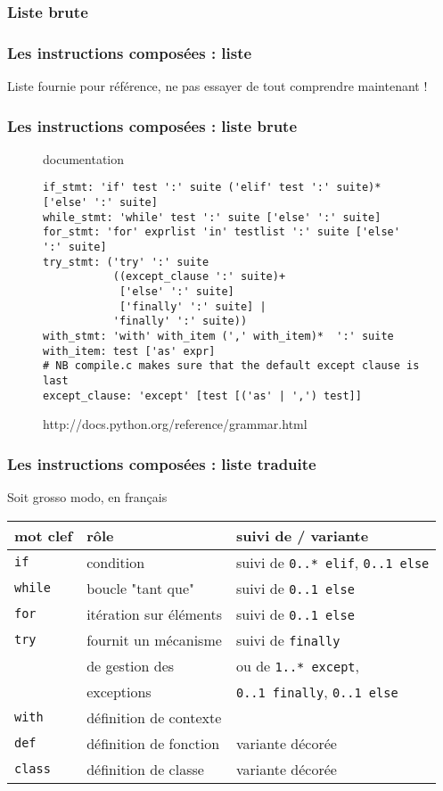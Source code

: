\subsubsection{Liste brute}
\begin{frame}[fragile]
  \frametitle{Les instructions composées : liste}
Liste fournie pour référence, ne pas essayer de tout comprendre maintenant !
\end{frame}

\begin{frame}[fragile]
  \frametitle{Les instructions composées : liste brute}
\begin{figure}
  \begin{beamercolorbox}{documentation}
\scriptsize\begin{verbatim}
if_stmt: 'if' test ':' suite ('elif' test ':' suite)* ['else' ':' suite]
while_stmt: 'while' test ':' suite ['else' ':' suite]
for_stmt: 'for' exprlist 'in' testlist ':' suite ['else' ':' suite]
try_stmt: ('try' ':' suite
           ((except_clause ':' suite)+
            ['else' ':' suite]
            ['finally' ':' suite] |
           'finally' ':' suite))
with_stmt: 'with' with_item (',' with_item)*  ':' suite
with_item: test ['as' expr]
# NB compile.c makes sure that the default except clause is last
except_clause: 'except' [test [('as' | ',') test]]
\end{verbatim}
  \end{beamercolorbox}
\def\figurename{extrait de la grammaire de Python}
\caption{http://docs.python.org/reference/grammar.html}
\end{figure}
\end{frame}

\begin{frame}[fragile]
  \frametitle{Les instructions composées : liste traduite}
Soit grosso modo, en français
\small\begin{tabular}{|l|l|l|}
\hline
mot clef & rôle & suivi de / variante \\
\hline \hline
\texttt{if} & condition & suivi de \texttt{0..* elif}, \texttt{0..1 else}\\ \hline
\texttt{while} & boucle "tant que" & suivi de \texttt{0..1 else}\\ \hline
\texttt{for} & itération sur éléments & suivi de \texttt{0..1 else}\\ \hline
\texttt{try} & fournit un mécanisme & suivi de \texttt{finally}\\
 & de gestion des &  ou de \texttt{1..* except}, \\
 & exceptions & \texttt{0..1 finally}, \texttt{0..1 else}\\ \hline
\texttt{with} & définition de contexte & \\ \hline
\texttt{def} & définition de fonction & variante décorée \\ \hline
\texttt{class} & définition de classe & variante décorée \\ \hline
\end{tabular}
\end{frame}


